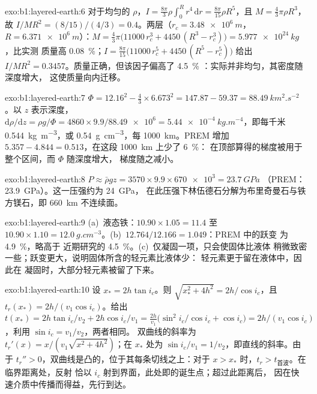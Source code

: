 \begin{solution}{exo:b1:layered-earth:6}
对于均匀的 $\rho$，$I = \tfrac{8\pi}{3}\rho\int_0^R r^4\,\mathrm dr =
\tfrac{8\pi}{15}\rho R^5$，且 $M = \tfrac43\pi\rho R^3$，故
$I/MR^2 = (8/15)/(4/3) = 0.4$。两层（$r_c = \qty{3.48e6}{m}$，
$R = \qty{6.371e6}{m}$）：$M = \tfrac43\pi\bigl(11000\,r_c^3 + 4450\,(R^3 -
r_c^3)\bigr) = \qty{5.977e24}{kg}$，比实测
质量高 \qty{0.08}{\percent}；$I = \tfrac{8\pi}{15}\bigl(11000\,r_c^5 + 4450\,(R^5 - r_c^5)\bigr)$ 给出
$I/MR^2 = 0.3457$。质量正确，但该因子偏高了 \qty{4.5}{\percent}
：实际并非均匀，其密度随深度增大，
这使质量向内迁移。
\end{solution}

\begin{solution}{exo:b1:layered-earth:7}
$\Phi = 12.16^2 - \tfrac43\times6.673^2 = 147.87 - 59.37 =
\qty{88.49}{km^2.s^{-2}}$。以 $z$ 表示深度，
$\mathrm d\rho/\mathrm dz = \rho g/\Phi = 4860\times9.9/\num{88.49e6} =
\qty{5.44e-4}{kg.m^{-4}}$，即每千米 \qty{0.544}{kg.m^{-3}}，或
\qty{0.54}{g.cm^{-3}}，每 \qty{1000}{km}。PREM 增加 $5.357 - 4.844 =
0.513$，在这段 \qty{1000}{km} 上少了 \qty{6}{\percent}：
在顶部算得的梯度被用于整个区间，而 $\Phi$ 随深度增大，
梯度随之减小。
\end{solution}

\begin{solution}{exo:b1:layered-earth:8}
$P \approx \bar\rho g z = 3570\times9.9\times\num{670e3} = \qty{23.7}{GPa}$
（PREM：\qty{23.9}{GPa}）。这一压强约为 \qty{24}{GPa}，
在此压强下林伍德石分解为布里奇曼石与铁方镁石，即
\qty{660}{km} 不连续面。
\end{solution}

\begin{solution}{exo:b1:layered-earth:9}
(a)~液态铁：$10.90\times1.05 = 11.4$ 至 $10.90\times1.10 =
\qty{12.0}{g.cm^{-3}}$。(b)~$12.764/12.166 = 1.049$：PREM 中的跃变
为 \qty{4.9}{\percent}，略高于
近期研究的 \qty{4.5}{\percent}。(c)~仅凝固一项，只会使固体比液体
稍微致密一些；跃变更大，说明固体所含的轻元素比液体少：
轻元素更于留在液体中，因此在
凝固时，大部分轻元素被留了下来。
\end{solution}

\begin{solution}{exo:b1:layered-earth:10}
设 $x_* = 2h\tan i_c$。则 $\sqrt{x_*^2 + 4h^2} = 2h/\cos i_c$，且
$t_r(x_*) = 2h/(v_1\cos i_c)$。给出
$t(x_*) = 2h\tan i_c/v_2 + 2h\cos i_c/v_1 = \frac{2h}{v_1}\bigl(\sin^2 i_c/\cos
i_c + \cos i_c\bigr) = 2h/(v_1\cos i_c)$，利用 $\sin i_c = v_1/v_2$，两者相同。
双曲线的斜率为 $t_r'(x) = x/(v_1\sqrt{x^2 + 4h^2})$；在 $x_*$ 处为
$\sin i_c/v_1 = 1/v_2$，即直线的斜率。由于
$t_r'' > 0$，双曲线是凸的，位于其每条切线之上：对于
$x > x_*$ 时，$t_r > t_{\text{首波}}$。在临界距离处，反射
恰以 $i_c$ 射到界面，此处即的诞生点；超过此距离后，
因在快速介质中传播而得益，先行到达。
\end{solution}

